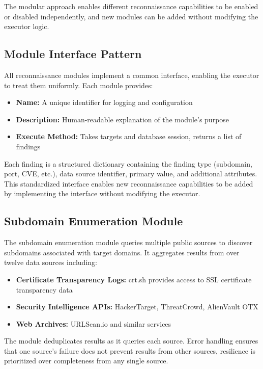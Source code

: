 \documentclass[a4paper,12pt]{report}
\begin{document}
The modular approach enables different reconnaissance capabilities to be enabled or disabled independently, and new modules can be added without modifying the executor logic.\hfill \break

\subsection{Module Interface Pattern}

All reconnaissance modules implement a common interface, enabling the executor to treat them uniformly. Each module provides:

\begin{itemize}
\item \textbf{Name:} A unique identifier for logging and configuration
\item \textbf{Description:} Human-readable explanation of the module's purpose
\item \textbf{Execute Method:} Takes targets and database session, returns a list of findings
\end{itemize}

Each finding is a structured dictionary containing the finding type (subdomain, port, CVE, etc.), data source identifier, primary value, and additional attributes. This standardized interface enables new reconnaissance capabilities to be added by implementing the interface without modifying the executor.\hfill \break

\subsection{Subdomain Enumeration Module}

The subdomain enumeration module queries multiple public sources to discover subdomains associated with target domains. It aggregates results from over twelve data sources including:

\begin{itemize}
\item \textbf{Certificate Transparency Logs:} crt.sh provides access to SSL certificate transparency data
\item \textbf{Security Intelligence APIs:} HackerTarget, ThreatCrowd, AlienVault OTX
\item \textbf{Web Archives:} URLScan.io and similar services
\end{itemize}

The module deduplicates results as it queries each source. Error handling ensures that one source's failure does not prevent results from other sources, resilience is prioritized over completeness from any single source.\hfill \break
\end{document}
